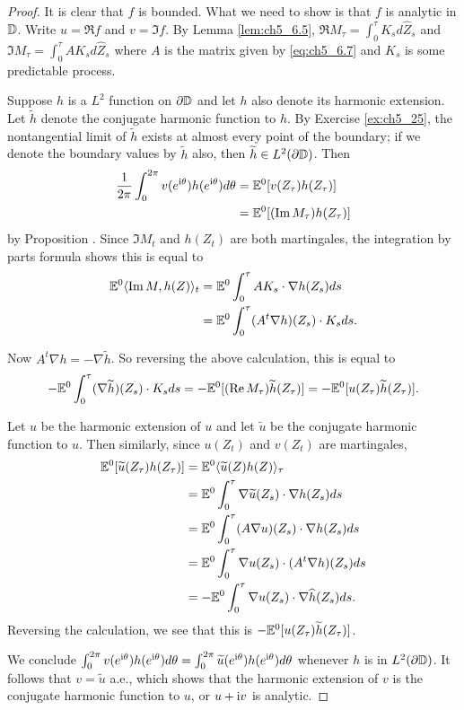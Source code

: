 \begin{proof}
It is clear that $f$ is bounded. What we need to show is that $f$ is analytic in $\mathbb{D}$. Write $u = \Re f$ and $v = \Im f$. By Lemma \ref{lem:ch5_6.5}, $\Re M_\tau = \int_0^\tau K_s d\widehat{Z}_s$ and $\Im M_\tau = \int_0^\tau AK_s d\widehat{Z}_s$ where $A$ is the matrix given by \eqref{eq:ch5_6.7} and $K_s$ is some predictable process.

Suppose $h$ is a $L^2$ function on $\partial\mathbb{D}$ and let $h$ also denote its harmonic extension. Let $\widetilde{h}$ denote the conjugate harmonic function to $h$. By Exercise \ref{ex:ch5_25}, the nontangential limit of $\widetilde{h}$ exists at almost every point of the boundary; if we denote the boundary values by $\widetilde{h}$ also, then $\widetilde{h} \in L^2(\partial\mathbb{D})$. Then
\begin{align*}
    \frac{1}{2\pi} \int_0^{2\pi} v(e^{\mathrm{i}\theta})h(e^{\mathrm{i}\theta})d\theta &= \mathbb{E}^0[v(Z_\tau)h(Z_\tau)] \\
    &= \mathbb{E}^0[(\operatorname{Im} M_\tau)h(Z_\tau)]
\end{align*}
by Proposition . Since $\Im M_t$ and $h(Z_t)$ are both martingales, the integration by parts formula shows this is equal to
\begin{align*}
    \mathbb{E}^0\langle \operatorname{Im} M,h(Z) \rangle_t &= \mathbb{E}^0 \int_0^\tau AK_s \cdot \nabla h(Z_s)ds \\
    &= \mathbb{E}^0 \int_0^\tau (A^t\nabla h)(Z_s) \cdot K_s ds.
\end{align*}

\mnewpage

Now $A^t\nabla h = -\nabla\widetilde{h}$. So reversing the above calculation, this is equal to
\[
    -\mathbb{E}^0 \int_0^\tau (\nabla\widetilde{h})(Z_s) \cdot K_s ds = -\mathbb{E}^0[(\operatorname{Re} M_\tau)\widetilde{h}(Z_\tau)] = -\mathbb{E}^0[u(Z_\tau)\widetilde{h}(Z_\tau)].
\]

Let $u$ be the harmonic extension of $u$ and let $\widetilde{u}$ be the conjugate harmonic function to $u$. Then similarly, since $u(Z_t)$ and $v(Z_t)$ are martingales,
\begin{align*}
    \mathbb{E}^0[\widetilde{u}(Z_\tau)h(Z_\tau)] &= \mathbb{E}^0\langle \widetilde{u}(Z)h(Z) \rangle_\tau \\
    &= \mathbb{E}^0 \int_0^\tau \nabla\widetilde{u}(Z_s) \cdot \nabla h(Z_s)ds \\
    &= \mathbb{E}^0 \int_0^\tau (A\nabla u)(Z_s) \cdot \nabla h(Z_s)ds \\
    &= \mathbb{E}^0 \int_0^\tau \nabla u(Z_s) \cdot (A^t\nabla h)(Z_s)ds \\
    &= -\mathbb{E}^0 \int_0^\tau \nabla u(Z_s) \cdot \nabla \widehat{h}(Z_s)ds.
\end{align*}
Reversing the calculation, we see that this is $-\mathbb{E}^0[u(Z_\tau)\widetilde{h}(Z_\tau)]$.

We conclude $\int_0^{2\pi} v(e^{\mathrm{i}\theta})h(e^{\mathrm{i}\theta})d\theta = \int_0^{2\pi} \widetilde{u}(e^{\mathrm{i}\theta})h(e^{\mathrm{i}\theta})d\theta$ whenever $h$ is in $L^2(\partial\mathbb{D})$. It follows that $v = \widetilde{u}$ a.e., which shows that the harmonic extension of $v$ is the conjugate harmonic function to $u$, or $u + \mathrm{i} v$ is analytic.
\end{proof}

